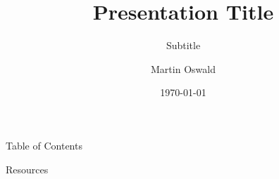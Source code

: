 \documentclass[
11pt, 
xcolor=x11names,
aspectratio=169,
]{beamer}
\title{Presentation Title}
\subtitle{Subtitle}
\author{Martin Oswald}
\date{\today}
\begin{document}
\frame[plain]{\titlepage}

\begin{frame}{Table of Contents}
    \tableofcontents
\end{frame}




\begin{frame}[allowframebreaks]{Resources}
    \printbibliography
\end{frame}

\end{document}
